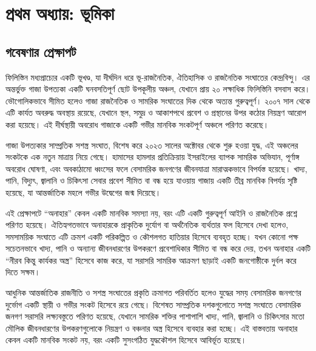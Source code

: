 \clearpage
\tableofcontents

\section{প্রথম অধ্যায়: ভূমিকা}\label{ux9aaux9b0ux9a5ux9ae-ux985ux9a7ux9afux9df-ux9adux9aeux995}

\subsection{গবেষণার প্রেক্ষাপট}\label{ux997ux9acux9b7ux9a3ux9b0-ux9aaux9b0ux995ux9b7ux9aaux99f}

ফিলিস্তিন মধ্যপ্রাচ্যের একটি ভূখণ্ড, যা দীর্ঘদিন ধরে ভূ-রাজনৈতিক, ঐতিহাসিক ও রাজনৈতিক সংঘাতের কেন্দ্রবিন্দু। এর অন্তর্ভুক্ত গাজা উপত্যকা একটি ঘনবসতিপূর্ণ ছোট উপকূলীয় অঞ্চল, যেখানে প্রায় ২০ লক্ষাধিক ফিলিস্তিনি বসবাস করে। ভৌগোলিকভাবে সীমিত হলেও গাজা রাজনৈতিক ও সামরিক সংঘাতের দিক থেকে অত্যন্ত গুরুত্বপূর্ণ। ২০০৭ সাল থেকে এটি কার্যত অবরুদ্ধ অবস্থায় রয়েছে, যেখানে স্থল, সমুদ্র ও আকাশপথে প্রবেশ ও প্রস্থানের উপর কঠোর নিয়ন্ত্রণ আরোপ করা হয়েছে। এই দীর্ঘস্থায়ী অবরোধ গাজাকে একটি গভীর মানবিক সংকটপূর্ণ অঞ্চলে পরিণত করেছে।

গাজা উপত্যকার সাম্প্রতিক সশস্ত্র সংঘাত, বিশেষ করে ২০২৩ সালের অক্টোবর থেকে শুরু হওয়া যুদ্ধ, এই অঞ্চলের সংকটকে এক নতুন মাত্রায় নিয়ে গেছে। হামাসের হামলার প্রতিক্রিয়ায় ইসরাইলের ব্যাপক সামরিক অভিযান, পূর্ণাঙ্গ অবরোধ ঘোষণা, এবং অবকাঠামো ধ্বংসের ফলে বেসামরিক জনগণের জীবনযাত্রা মারাত্মকভাবে বিপর্যস্ত হয়েছে। খাদ্য, পানি, বিদ্যুৎ, জ্বালানি ও চিকিৎসা সেবার প্রবেশ সীমিত বা বন্ধ হয়ে যাওয়ায় গাজায় একটি তীব্র মানবিক বিপর্যয় সৃষ্টি হয়েছে, যা আন্তর্জাতিক মহলে গভীর উদ্বেগের জন্ম দিয়েছে।

এই প্রেক্ষাপটে ``অনাহার'' কেবল একটি মানবিক সমস্যা নয়, বরং এটি একটি গুরুত্বপূর্ণ আইনি ও রাজনৈতিক প্রশ্নে পরিণত হয়েছে। ঐতিহ্যগতভাবে অনাহারকে প্রাকৃতিক দুর্যোগ বা অর্থনৈতিক ব্যর্থতার ফল হিসেবে দেখা হলেও, সমসাময়িক সংঘাতে এটি ক্রমশ একটি পরিকল্পিত ও কৌশলগত হাতিয়ার হিসেবে ব্যবহৃত হচ্ছে। যখন কোনো পক্ষ সচেতনভাবে খাদ্য, পানি ও অন্যান্য জীবনধারণের উপকরণে প্রবেশাধিকার সীমিত বা বন্ধ করে দেয়, তখন অনাহার একটি ``নীরব কিন্তু কার্যকর অস্ত্র'' হিসেবে কাজ করে, যা সরাসরি সামরিক আক্রমণ ছাড়াই একটি জনগোষ্ঠীকে দুর্বল করে দিতে সক্ষম।

আধুনিক আন্তর্জাতিক রাজনীতি ও সশস্ত্র সংঘাতের প্রকৃতি ক্রমাগত পরিবর্তিত হলেও যুদ্ধের সময় বেসামরিক জনগণের দুর্ভোগ একটি স্থায়ী ও গভীর সংকট হিসেবে রয়ে গেছে। বিশেষত সাম্প্রতিক দশকগুলোতে সশস্ত্র সংঘাতে বেসামরিক জনগণ সরাসরি লক্ষ্যবস্তুতে পরিণত হয়েছে, যেখানে সামরিক শক্তির পাশাপাশি খাদ্য, পানি, জ্বালানি ও চিকিৎসার মতো মৌলিক জীবনধারণের উপকরণগুলোকে নিয়ন্ত্রণ ও বঞ্চনার অস্ত্র হিসেবে ব্যবহার করা হচ্ছে। এই বাস্তবতায় অনাহার কেবল একটি মানবিক সংকট নয়, বরং একটি সুসংগঠিত যুদ্ধকৌশল হিসেবে আবির্ভূত হয়েছে।

